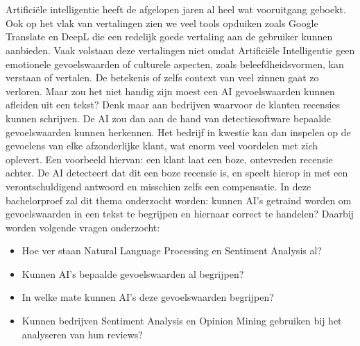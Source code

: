 
\chapter{}
\label{ch:inleiding}

Artificiële intelligentie heeft de afgelopen jaren al heel wat vooruitgang geboekt. Ook op het vlak van vertalingen zien we veel tools opduiken zoals Google Translate en DeepL die een redelijk goede vertaling aan de gebruiker kunnen aanbieden. Vaak volstaan deze vertalingen niet omdat Artificiële Intelligentie geen emotionele gevoelswaarden of culturele aspecten, zoals beleefdheidsvormen, kan verstaan of vertalen. De betekenis of zelfs context van veel zinnen gaat zo verloren. Maar zou het niet handig zijn moest een AI gevoelswaarden kunnen afleiden uit een tekst? Denk maar aan bedrijven waarvoor de klanten recensies kunnen schrijven. De AI zou dan aan de hand van detectiesoftware bepaalde gevoelswaarden kunnen herkennen. Het bedrijf in kwestie kan dan inspelen op de gevoelens van elke afzonderlijke klant, wat enorm veel voordelen met zich oplevert.
Een voorbeeld hiervan: een klant laat een boze, ontevreden recensie achter. De AI detecteert dat dit een boze recensie is, en speelt hierop in met een verontschuldigend antwoord en misschien zelfs een compensatie.  
In deze bachelorproef zal dit thema onderzocht worden: kunnen AI’s getraind worden om gevoelswaarden in een tekst te begrijpen en hiernaar correct te handelen? Daarbij worden volgende vragen onderzocht:

\begin{itemize}
    \item Hoe ver staan Natural Language Processing en Sentiment Analysis al?
    \item Kunnen AI's bepaalde gevoelswaarden al begrijpen?
    \item In welke mate kunnen AI's deze gevoelswaarden begrijpen?
    \item Kunnen bedrijven Sentiment Analysis en Opinion Mining gebruiken bij het analyseren van hun reviews?
\end{itemize}


\section{}
\label{sec:probleemstelling}

